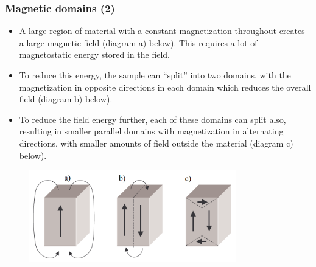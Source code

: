 \begin{frame}
	\frametitle{Magnetic domains (2)}
    \begin{itemize}
        \item A large region of material with a constant magnetization throughout creates a large magnetic field (diagram a) below). This requires a lot of magnetostatic energy stored in the field. 
        \item<2-> To reduce this energy, the sample can ``split'' into two domains, with the magnetization in opposite directions in each domain which reduces the overall field (diagram b) below).
        \item<3->  To reduce the field energy further, each of these domains can split also, resulting in smaller parallel domains with magnetization in alternating directions, with smaller amounts of field outside the material (diagram c) below).
    \end{itemize}
\begin{figure}
\begin{columns}
	\begin{column}{0.55\textwidth}
            \centering
            \includegraphics[width=0.8\textwidth]{fig/lec02/Magnetic_domains_energy_min.png}
    \end{column}
\end{columns}
\end{figure}
\end{frame}

